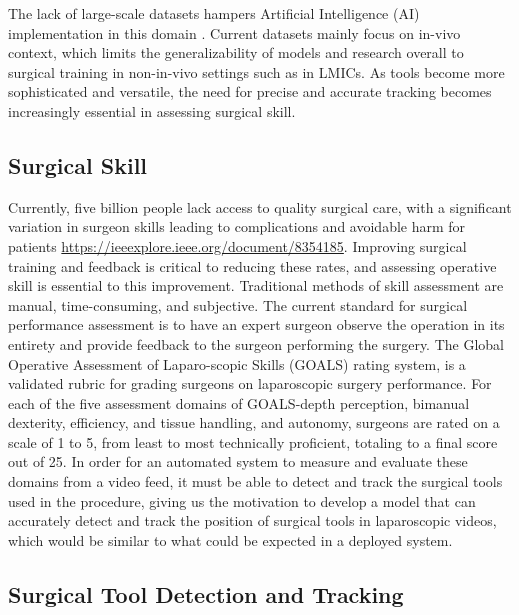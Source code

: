 The lack of large-scale datasets hampers Artificial Intelligence (AI) implementation in this domain \cite{nwoye_cholectrack20_2023}. Current datasets mainly focus on in-vivo context, which limits the generalizability of models and research overall to surgical training in non-in-vivo settings such as in LMICs. As tools become more sophisticated and versatile, the need for precise and accurate tracking becomes increasingly essential in assessing surgical skill.

\subsection{Surgical Skill}

Currently, five billion people lack access to quality surgical care, with a significant variation in surgeon skills leading to complications and avoidable harm for patients \url{https://ieeexplore.ieee.org/document/8354185}. Improving surgical training and feedback is critical to reducing these rates, and assessing operative skill is essential to this improvement. Traditional methods of skill assessment are manual, time-consuming, and subjective. The current standard for surgical performance assessment is to have an expert surgeon observe the operation in its entirety and provide feedback to the surgeon performing the surgery. The Global Operative Assessment of Laparo-scopic Skills (GOALS) rating system, is a validated rubric for grading surgeons on laparoscopic surgery performance. For each of the five assessment domains of GOALS-depth perception, bimanual dexterity, efficiency, and tissue handling, and autonomy, surgeons are rated on a scale of 1 to 5, from least to most technically proficient, totaling to a final score out of 25. In order for an automated system to measure and evaluate these domains from a video feed, it must be able to detect and track the surgical tools used in the procedure, giving us the motivation to develop a model that can accurately detect and track the position of surgical tools in laparoscopic videos, which would be similar to what could be expected in a deployed system.


\subsection{Surgical Tool Detection and Tracking}

